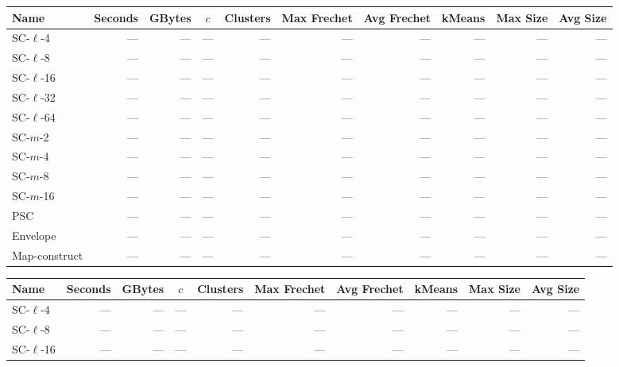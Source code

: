 \documentclass[11pt]{article}
\begin{document}
\begin{figure} \begin{center}
    \begin{minipage}{\textwidth}
    {
    \begin{tabular}{@{}lrrcrrrrrr@{}}
        \toprule
        Name & Seconds & GBytes & $c$ & Clusters & Max Frechet & Avg Frechet & kMeans & Max Size & Avg Size\\
        \midrule
        SC-$\ell$-4 & --- & --- & --- & --- & --- & --- & --- & --- & ---\\
        SC-$\ell$-8 & --- & --- & --- & --- & --- & --- & --- & --- & ---\\
        SC-$\ell$-16 & --- & --- & --- & --- & --- & --- & --- & --- & ---\\
        SC-$\ell$-32 & --- & --- & --- & --- & --- & --- & --- & --- & ---\\
        SC-$\ell$-64 & --- & --- & --- & --- & --- & --- & --- & --- & ---\\
        SC-$m$-2 & --- & --- & --- & --- & --- & --- & --- & --- & ---\\
        SC-$m$-4 & --- & --- & --- & --- & --- & --- & --- & --- & ---\\
        SC-$m$-8 & --- & --- & --- & --- & --- & --- & --- & --- & ---\\
        SC-$m$-16 & --- & --- & --- & --- & --- & --- & --- & --- & ---\\
        PSC & --- & --- & --- & --- & --- & --- & --- & --- & ---\\
        Envelope & --- & --- & --- & --- & --- & --- & --- & --- & ---\\
        Map-construct & --- & --- & --- & --- & --- & --- & --- & --- & ---\\
        \bottomrule
    \end{tabular}
    }
    {
    \begin{tabular}{@{}lrrcrrrrrr@{}}
        \toprule
        Name & Seconds & GBytes & $c$ & Clusters & Max Frechet & Avg Frechet & kMeans & Max Size & Avg Size\\
        \midrule
        SC-$\ell$-4 & --- & --- & --- & --- & --- & --- & --- & --- & ---\\
        SC-$\ell$-8 & --- & --- & --- & --- & --- & --- & --- & --- & ---\\
        SC-$\ell$-16 & --- & --- & --- & --- & --- & --- & --- & --- & ---\\

\end{tabular}}
\end{minipage}
\end{center}
\end{figure}
\end{document}
